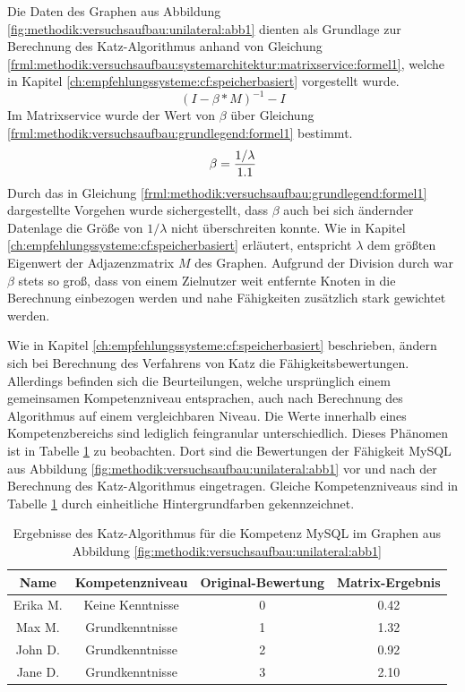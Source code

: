 Die Daten des Graphen aus Abbildung \ref{fig:methodik:versuchsaufbau:unilateral:abb1} dienten als Grundlage zur Berechnung des Katz-Algorithmus anhand von Gleichung \ref{frml:methodik:versuchsaufbau:systemarchitektur:matrixservice:formel1}, welche in Kapitel \ref{ch:empfehlungssysteme:cf:speicherbasiert} vorgestellt wurde.
\begin{equation}
	(I - \beta * M)^{-1} - I
	\label{frml:methodik:versuchsaufbau:systemarchitektur:matrixservice:formel1}
\end{equation}
Im Matrixservice wurde der Wert von $\beta$ über Gleichung \ref{frml:methodik:versuchsaufbau:grundlegend:formel1} bestimmt.
\begin{equation}
	\beta = \frac{1/\lambda}{1.1}
	\label{frml:methodik:versuchsaufbau:grundlegend:formel1}
\end{equation}
Durch das in Gleichung \ref{frml:methodik:versuchsaufbau:grundlegend:formel1} dargestellte Vorgehen wurde sichergestellt, dass $\beta$ auch bei sich ändernder Datenlage die Größe von $1/\lambda$ nicht überschreiten konnte. Wie in Kapitel \ref{ch:empfehlungssysteme:cf:speicherbasiert} erläutert, entspricht $\lambda$ dem größten Eigenwert der Adjazenzmatrix $M$ des Graphen. Aufgrund der Division durch \nenner war $\beta$ stets so groß, dass von einem Zielnutzer weit entfernte Knoten in die Berechnung einbezogen werden und nahe Fähigkeiten zusätzlich stark gewichtet werden.

Wie in Kapitel \ref{ch:empfehlungssysteme:cf:speicherbasiert} beschrieben, ändern sich bei Berechnung des Verfahrens von Katz die Fähigkeitsbewertungen. Allerdings befinden sich die Beurteilungen, welche ursprünglich einem gemeinsamen Kompetenzniveau entsprachen, auch nach Berechnung des Algorithmus auf einem vergleichbaren Niveau. Die Werte innerhalb eines Kompetenzbereichs sind lediglich feingranular unterschiedlich. Dieses Phänomen ist in Tabelle \ref{tbl:methodik:versuchsaufbau:unilateral:tbl1} zu beobachten. Dort sind die Bewertungen der Fähigkeit MySQL aus Abbildung \ref{fig:methodik:versuchsaufbau:unilateral:abb1} vor und nach der Berechnung des Katz-Algorithmus eingetragen. Gleiche Kompetenzniveaus sind in Tabelle \ref{tbl:methodik:versuchsaufbau:unilateral:tbl1} durch einheitliche Hintergrundfarben gekennzeichnet.

\begin{table}[h]
	\centering
	\begin{tabular}{c|c|c|c}
		\textbf{Name} & \textbf{Kompetenzniveau} & \textbf{Original-Bewertung} & \textbf{Matrix-Ergebnis} \\
		\hline
		\rowcolor{exxetagray}Erika M. & Keine Kenntnisse & 0 & 0.42\\
		\hline
		\rowcolor{itemcolor}Max M.    & Grundkenntnisse  & 1 & 1.32\\
		\rowcolor{itemcolor}John D.   & Grundkenntnisse  & 2 & 0.92\\
		\rowcolor{itemcolor}Jane D.   & Grundkenntnisse  & 3 & 2.10
	\end{tabular}
	\caption{Ergebnisse des Katz-Algorithmus für die Kompetenz MySQL im Graphen aus Abbildung \ref{fig:methodik:versuchsaufbau:unilateral:abb1}}
	\label{tbl:methodik:versuchsaufbau:unilateral:tbl1}
\end{table}


